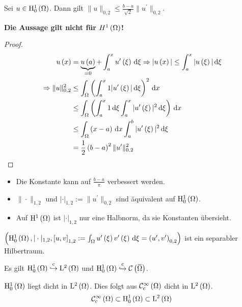 \begin{lemma}
	Sei $u\in\mathrm{H}^{1}_{0}\left(\Omega\right)$. Dann gilt $\|u\|_{0,2}\leq\frac{b-a}{\sqrt{2}}\|u^{\prime}\|_{0,2}$.
\end{lemma}
\textbf{Die Aussage gilt nicht für $H^{1}\left(\Omega\right)$!}
\begin{proof}
	\begin{align*}
		u\left(x\right) &= \underbrace{u\left(a\right)}_{= 0} + \int_{a}^{x}u^{\prime}\left(\xi\right)\,\mathrm{d}\xi \Rightarrow |u\left(x\right)|\leq\int_{a}^{x}|u\left(\xi\right)|\,\mathrm{d}\xi\\
		\Rightarrow \|u\|_{0,2}^{2} &\leq \int_{\Omega}\left(\int_{a}^{x}1|u^{\prime}\left(\xi\right)|\,\mathrm{d}\xi\right)^{2}\,\mathrm{d} x\\
			&\leq \int_{\Omega}\left(\int_{a}^{x}1\,\mathrm{d}\xi \int_{a}^{x}|u^{\prime}\left(\xi\right)|^{2}\,\mathrm{d}\xi\right)\,\mathrm{d} x\\
			&\leq \int_{\Omega}\left(x-a\right)\,\mathrm{d} x \int_{a}^{b}|u^{\prime}\left(\xi\right)|^{2}\,\mathrm{d}\xi\\
			&= \frac{1}{2}\left(b-a\right)^{2}\|u^{\prime}\|_{0,2}^{2}
	\end{align*}
\end{proof}
\begin{itemize}
	\item Die Konstante kann auf $\frac{b-a}{\pi}$ verbessert werden.
	\item $\|\cdot\|_{1,2}$ und $|\cdot|_{1,2} := \|u^{\prime}\|_{0,2}$ sind äquivalent auf $\mathrm{H}^{1}_{0}\left(\Omega\right)$.{}
	\item Auf $\mathrm{H}^{1}\left(\Omega\right)$ ist $|\cdot|_{1,2}$ nur eine Halbnorm, da sie Konstanten übersieht.
\end{itemize}

\begin{lemma}[Satz]
	$\left(\mathrm{H}^{1}_{0}\left(\Omega\right),|\cdot|_{1,2},\left[u,v\right]_{1,2}:=\int_{\Omega}u^{\prime}\left(\xi\right)v^{\prime}\left(\xi\right)\,\mathrm{d}\xi=\left(u^{\prime},v^{\prime}\right)_{0,2}\right)$ ist ein separabler Hilbertraum.
	
	Es gilt $\H^{1}_{0}\left(\W\right)\cembed\L^{2}\left(\W\right)$ und $\H^{1}_{0}\left(\W\right)\cembed\C\left(\overbar{\W}\right)$.
\end{lemma}

\begin{lemma}[Satz]
	$\mathrm{H}^{1}_{0}\left(\Omega\right)$ liegt dicht in $\mathrm{L}^{2}\left(\Omega\right)$. Dies folgt aus $\mathcal{C}^{\infty}_{\text{c}}\left(\Omega\right)$ dicht in $\mathrm{L}^{2}\left(\Omega\right)$.{}
	\begin{equation*}
		\mathcal{C}^{\infty}_{\text{c}}\left(\Omega\right) \subset \mathrm{H}^{1}_{0}\left(\Omega\right) \subset \mathrm{L}^{2}\left(\Omega\right){}
	\end{equation*}
\end{lemma}


